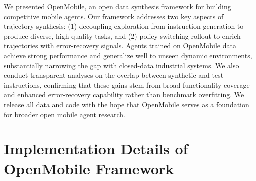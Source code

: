 \documentclass{article} %
\begin{document}
We presented OpenMobile, an open data synthesis framework for building competitive mobile agents.
Our framework addresses two key aspects of trajectory synthesis: (1) decoupling exploration from instruction generation to produce diverse, high-quality tasks, and (2) policy-switching rollout to enrich trajectories with error-recovery signals.
Agents trained on OpenMobile data achieve strong performance and generalize well to unseen dynamic environments, substantially narrowing the gap with closed-data industrial systems.
We also conduct transparent analyses on the overlap between synthetic and test instructions, confirming that these gains stem from broad functionality coverage and enhanced error-recovery capability rather than benchmark overfitting.
We release all data and code with the hope that OpenMobile serves as a foundation for broader open mobile agent research.








\appendix
{}

\section{Implementation Details of OpenMobile Framework}
\label{app:openmobile_detail}
\end{document}
